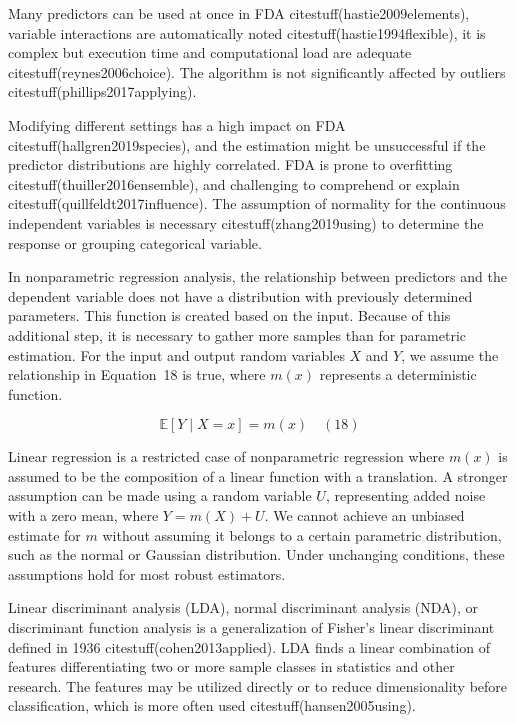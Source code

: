 \documentclass[preprint,12pt]{elsarticle}
\begin{document}
Many predictors can be used at once in FDA citestuff(hastie2009elements), variable interactions are automatically noted citestuff(hastie1994flexible), it is complex but execution time and computational load are adequate citestuff(reynes2006choice). The algorithm is not significantly affected by outliers citestuff(phillips2017applying).

Modifying different settings has a high impact on FDA citestuff(hallgren2019species), and the estimation might be unsuccessful if the predictor distributions are highly correlated. FDA is prone to overfitting citestuff(thuiller2016ensemble), and challenging to comprehend or explain citestuff(quillfeldt2017influence). The assumption of normality for the continuous independent variables is necessary citestuff(zhang2019using) to determine the response or grouping categorical variable. 

In nonparametric regression analysis, the relationship between predictors and the dependent variable does not have a distribution with previously determined parameters. This function is created based on the input. Because of this additional step, it is necessary to gather more samples than for parametric estimation. For the input and output random variables $X$ and $Y$, we assume the relationship in Equation~18 is true, where $m\left(x\right)$ represents a deterministic function.

\begin{equation}
	\mathbb{E}[Y\mid X=x]=m\left(x\right)
	\quad\left(18\right)
\end{equation}

Linear regression is a restricted case of nonparametric regression where $m\left(x\right)$ is assumed to be the composition of a linear function with a translation. A stronger assumption can be made using a random variable $U$, representing added noise with a zero mean, where $Y=m\left(X\right)+U$. We cannot achieve an unbiased estimate for $m$ without assuming it belongs to a certain parametric distribution, such as the normal or Gaussian distribution. Under unchanging conditions, these assumptions hold for most robust estimators.

Linear discriminant analysis (LDA), normal discriminant analysis (NDA), or discriminant function analysis is a generalization of Fisher's linear discriminant defined in 1936 citestuff(cohen2013applied). LDA finds a linear combination of features differentiating two or more sample classes in statistics and other research. The features may be utilized directly or to reduce dimensionality before classification, which is more often used citestuff(hansen2005using).
\end{document}
